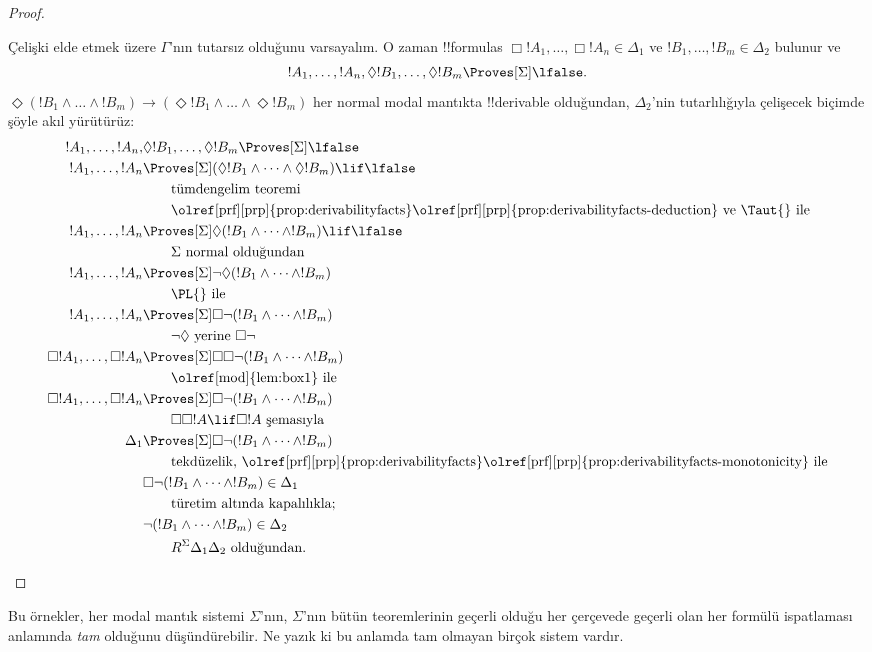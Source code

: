 \begin{proof}
\begin{enumerate}
    Çelişki elde etmek üzere $\Gamma$'nın tutarsız olduğunu varsayalım.
    O zaman !!{formula}s $\Box!A_1,\dots,\Box!A_n\in\Delta_1$ ve
    $!B_1,\dots,!B_m\in\Delta_2$ bulunur ve
    \[!A_1,\dots,!A_n,\Diamond!B_1,\dots,\Diamond!B_m
      \Proves[\Sigma]\lfalse.\]
    $\Diamond(!B_1\land\dots\land !B_m)\to
    (\Diamond!B_1\land\dots\land\Diamond!B_m)$ her normal modal mantıkta
    !!{derivable} olduğundan, $\Delta_2$'nin tutarlılığıyla çelişecek biçimde
    şöyle akıl yürütürüz:
    \begin{align*}
      !A_1, \dots, !A_n, & \Diamond!B_1, \dots,
      \Diamond!B_m \Proves[\Sigma] \lfalse \\
      !A_1, \dots,!A_n & \Proves[\Sigma] (\Diamond!B_1 \land
      \dots \land \Diamond!B_m) \lif \lfalse\\
      & \qquad\text{tümdengelim teoremi}\\
      & \qquad\text{\olref[prf][prp]{prop:derivabilityfacts}\olref[prf][prp]{prop:derivabilityfacts-deduction} ve \Taut{} ile} \\
      !A_1, \dots,!A_n & \Proves[\Sigma]
      \Diamond(!B_1 \land \dots \land !B_m) \lif \lfalse\\
      & \qquad \text{$\Sigma$ normal olduğundan} \\
      !A_1, \dots,!A_n & \Proves[\Sigma]
      \lnot\Diamond (!B_1 \land \dots \land !B_m)\\
      & \qquad\text{\PL{} ile} \\
      !A_1, \dots,!A_n & \Proves[\Sigma]
      \Box\lnot (!B_1 \land \dots \land !B_m)\\
      & \qquad\text{$\lnot\Diamond$ yerine $\Box\lnot$} \\
      \Box!A_1, \dots,\Box!A_n
      & \Proves[\Sigma] \Box\Box \lnot (!B_1 \land \dots \land !B_m)\\
      & \qquad\text{\olref[mod]{lem:box1} ile} \\
      \Box!A_1, \dots,\Box!A_n
      & \Proves[\Sigma]
      \Box\lnot (!B_1 \land \dots \land !B_m)\\
      &\qquad\text{$\Box\Box!A\lif\Box!A$ şemasıyla} \\
      \Delta_1 & \Proves[\Sigma]
      \Box\lnot (!B_1 \land \dots \land !B_m)\\
      &\qquad\text{tekdüzelik,
      \olref[prf][prp]{prop:derivabilityfacts}\olref[prf][prp]{prop:derivabilityfacts-monotonicity} ile} \\
      & \Box\lnot (!B_1 \land \dots \land !B_m) \in \Delta_1\\
      &\qquad\text{türetim altında kapalılıkla}; \\
      & \lnot (!B_1 \land \dots \land !B_m) \in \Delta_2\\
      &\qquad \text{$R^\Sigma\Delta_1\Delta_2$ olduğundan.}
    \end{align*}
  \end{enumerate}
\end{proof}

Bu örnekler, her modal mantık sistemi $\Sigma$'nın, $\Sigma$'nın bütün
teoremlerinin geçerli olduğu her çerçevede geçerli olan her formülü
ispatlaması anlamında \emph{tam} olduğunu düşündürebilir. Ne yazık ki bu
anlamda tam olmayan birçok sistem vardır.

